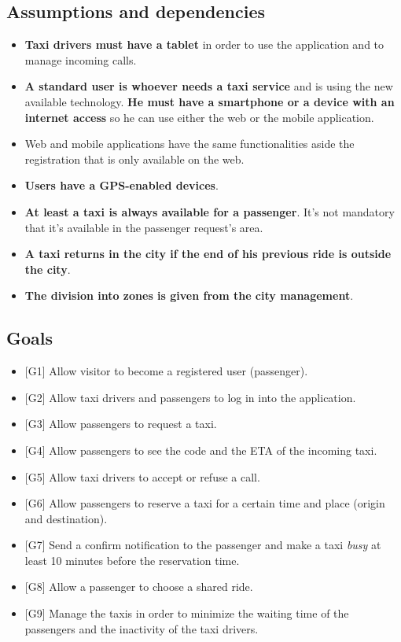 \documentclass{article}
\begin{document}
\subsection{Assumptions and dependencies}
\begin{itemize}
\item \textbf{Taxi drivers must have a tablet} in order to use the application and to manage incoming calls.
\item \textbf{A standard user is whoever needs a taxi service} and is using the new available technology. \textbf{He must have a smartphone or a device with an internet access} so he can use either the web or the mobile application.
\item Web and mobile applications have the same functionalities aside the registration that is only available on the web.
\item \textbf{Users have a GPS-enabled devices}.
\item \textbf{At least a taxi is always available for a passenger}. It's not mandatory that it's available in the passenger request's area.
\item \textbf{A taxi returns in the city if the end of his previous ride is outside the city}.
\item \textbf{The division into zones is given from the city management}.
\end{itemize}

\subsection{Goals}
\begin{itemize}
\item {[}G1{]} Allow visitor to become a registered user (passenger).
\item {[}G2{]} Allow taxi drivers and passengers to log in into the application.
\item {[}G3{]} Allow passengers to request a taxi.
\item {[}G4{]} Allow passengers to see the code and the ETA of the incoming taxi.
\item {[}G5{]} Allow taxi drivers to accept or refuse a call.
\item {[}G6{]} Allow passengers to reserve a taxi for a certain time and place (origin and destination).
\item {[}G7{]} Send a confirm notification to the passenger and make a taxi \textit{busy} at least 10 minutes before the reservation time.
\item {[}G8{]} Allow a passenger to choose a shared ride.
\item {[}G9{]} Manage the taxis in order to minimize the waiting time of the passengers and the inactivity of the taxi drivers.
\end{itemize}
\end{document}
